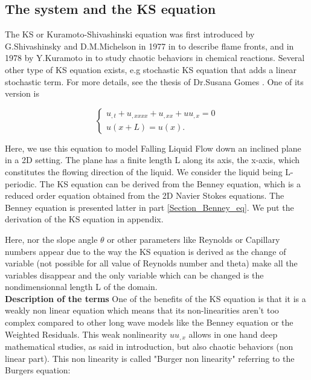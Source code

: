 \documentclass[12pt]{article}
\begin{document}
\subsection{The system and the KS equation}

The KS or Kuramoto-Shivashinski equation was first introduced by G.Shivashinsky and D.M.Michelson in 1977 in \cite{Shiv_Michelson_KS_eq} to describe flame fronts, and in 1978 by Y.Kuramoto in \cite{Kuramoto_KS_eq} to study chaotic behaviors in chemical reactions. Several other type of KS equation exists, e.g stochastic KS equation that adds  a linear stochastic term. For more details, see the thesis of Dr.Susana Gomes \cite{Susana_thesis}. One of its version is

\begin{equation}\label{KS_eq_L}
\left\{
\begin{aligned}
    u_{,t} + u_{,xxxx}  + u_{,xx} + uu_{,x} = 0 \\
    u(x+L)=u(x). 
\end{aligned}
\right.
\end{equation}



Here, we use this equation to model Falling Liquid Flow down an inclined plane in a 2D setting. The plane has a finite length L along its axis, the x-axis, which constitutes the flowing direction of the liquid. We consider the liquid being L-periodic. 
The KS equation can be derived from the Benney equation, which is a reduced order equation obtained from the 2D Navier Stokes equations. The Benney equation is presented latter in part \ref{Section_Benney_eq}. We put the derivation of the KS equation in appendix. 

Here, nor the slope angle $\theta$ or other parameters like Reynolds or Capillary numbers appear due to the way the KS equation is derived as the change of variable (not possible for all value of Reynolds number and theta) make all the variables disappear and the only variable which can be changed is the nondimensionnal length L of the domain. 
\\

\textbf{Description of the terms}
One of the benefits of the KS equation is that it is a weakly non linear equation which means that its non-linearities aren't too complex compared to other long wave models like the Benney equation or the Weighted Residuals. This weak nonlinearity $uu_{,x}$ allows in one hand deep mathematical studies, as said in introduction, but also chaotic behaviors (non linear part). This non linearity is called "Burger non linearity" referring to the Burgers equation:
\end{document}
